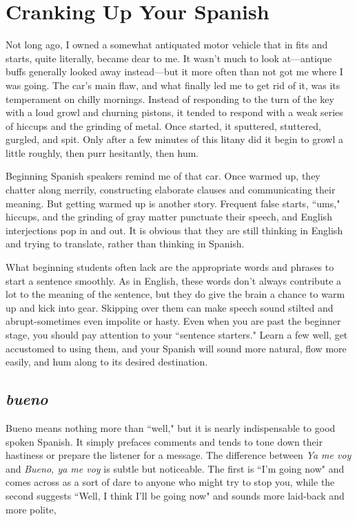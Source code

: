 \chapter{Cranking Up Your Spanish}

Not long ago, I owned a somewhat antiquated motor vehicle
that in fits and starts, quite literally, became dear to me. It wasn't
much to look at---antique buffs generally looked away instead---but
it more often than not got me where I was going. The car's main flaw,
and what finally led me to get rid of it, was its temperament on chilly
mornings. Instead of responding to the turn of the key with a loud
growl and churning pistons, it tended to respond with a weak series of
hiccups and the grinding of metal. Once started, it sputtered, stuttered,
gurgled, and spit. Only after a few minutes of this litany did it begin to
growl a little roughly, then purr hesitantly, then hum.

Beginning Spanish speakers remind me of that car. Once
warmed up, they chatter along merrily, constructing elaborate clauses
and communicating their meaning. But getting warmed up is another
story. Frequent false starts, ``ums," hiccups, and the grinding of gray
matter punctuate their speech, and English interjections pop in and
out. It is obvious that they are still thinking in English and trying to
translate, rather than thinking in Spanish.

What beginning students often lack are the appropriate words
and phrases to start a sentence smoothly. As in English, these words
don't always contribute a lot to the meaning of the sentence, but they
do give the brain a chance to warm up and kick into gear. Skipping
over them can make speech sound stilted and abrupt-sometimes
even impolite or hasty. Even when you are past the beginner stage, you
should pay attention to your ``sentence starters." Learn a few well, get
accustomed to using them, and your Spanish will sound more natural,
flow more easily, and hum along to its desired destination.

\section{\emph{bueno}}

Bueno means nothing more than ``well," but it is nearly indispensable to good spoken Spanish. It simply prefaces comments and tends
to tone down their hastiness or prepare the listener for a message. The
difference between \emph{Ya me voy} and \emph{Bueno, ya me voy} is subtle but noticeable. The first is ``I'm going now" and comes across as a sort of dare
to anyone who might try to stop you, while the second suggests ``Well,
I think I'll be going now" and sounds more laid-back and more polite,

